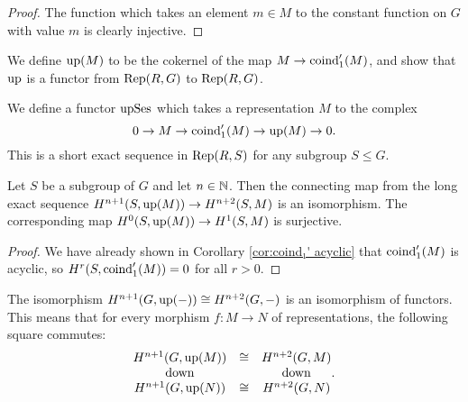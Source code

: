 \begin{proof}
  The function which takes an element $m \in M$ to the constant
  function on $G$ with value $m$ is clearly injective.
\end{proof}

\begin{definition}
	\label{def:up}
	We define $\mathrm{up}(M)$ to be the cokernel of the map $M \to \mathrm{coind}_1'(M)$,
	and show that $\mathrm{up}$ is a functor from $\mathrm{Rep}(R,G)$ to $\mathrm{Rep}(R,G)$.
\end{definition}

\begin{definition}
	\label{def:up ses}
	\leanok
	We define a functor $\mathrm{upSes}$ which takes a representation $M$ to the complex
	\[
		0 \to M \to \mathrm{coind}_1'(M) \to \mathrm{up}(M) \to 0.
	\]
	This is a short exact sequence in $\mathrm{Rep}(R,S)$ for any subgroup $S \le G$.
\end{definition}

\begin{corollary}
	\label{cor:up iso}
	\leanok
	Let $S$ be a subgroup of $G$ and let $n \in {\mathbb N}$.
	Then the connecting map from the long exact sequence $H^{n+1}(S,\mathrm{up}(M)) \to H^{n+2}(S,M)$ is an
	isomorphism.
	The corresponding map $H^{0}(S,\mathrm{up}(M)) \to H^{1}(S,M)$ is	surjective.
\end{corollary}

\begin{proof}
	We have already shown in Corollary \ref{cor:coind₁' acyclic}
	that $\mathrm{coind}_1'(M)$ is acyclic, so $H^{r}(S,\mathrm{coind}_1'(M))=0$
	for all $r>0$.
\end{proof}

\begin{lemma}
	\label{lem:up iso natural}
	\leanok
	The isomorphism $H^{n+1}(G,\mathrm{up}(-)) \cong H^{n+2}(G,-)$ is an isomorphism of functors.
	This means that for every morphism $f : M \to N$ of representations, the following square commutes:
	\[
		\begin{matrix}
			H^{n+1}(G,\mathrm{up}(M)) & \cong & H^{n+2}(G,M) \\
			\mathrm{down} && \mathrm{down} \\
			H^{n+1}(G,\mathrm{up}(N)) & \cong & H^{n+2}(G,N)
		\end{matrix}.
	\]
\end{lemma}

